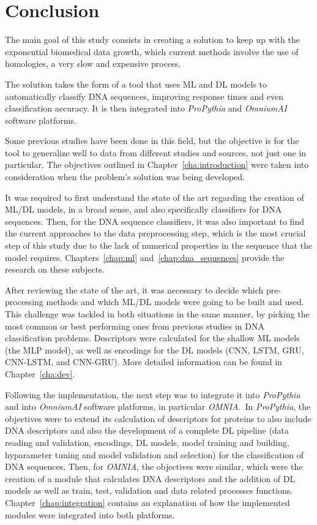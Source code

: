 \chapter{Conclusion}

The main goal of this study consists in creating a solution to keep up with the exponential biomedical data growth, which current methods involve the use of homologies, a very slow and expensive process. 

The solution takes the form of a tool that uses \gls{ML} and \gls{DL} models to automatically classify \gls{DNA} sequences, improving response times and even classification accuracy. It is then integrated into \textit{ProPythia} and \textit{OmniumAI} software platforms.

Some previous studies have been done in this field, but the objective is for the tool to generalize well to data from different studies and sources, not just one in particular. The objectives outlined in Chapter~\ref{cha:introduction} were taken into consideration when the problem's solution was being developed.

It was required to first understand the state of the art regarding the creation of \gls{ML}/\gls{DL} models, in a broad sense, and also specifically classifiers for \gls{DNA} sequences. Then, for the \gls{DNA} sequence classifiers, it was also important to find the current approaches to the data preprocessing step, which is the most crucial step of this study due to the lack of numerical properties in the sequence that the model requires. Chapters~\ref{chap:ml} and~\ref{chap:dna_sequences} provide the research on these subjects.

After reviewing the state of the art, it was necessary to decide which pre-processing methods and which \gls{ML}/\gls{DL} models were going to be built and used. This challenge was tackled in both situations in the same manner, by picking the most common or best performing ones from previous studies in \gls{DNA} classification problems. Descriptors were calculated for the shallow \gls{ML} models (the \gls{MLP} model), as well as encodings for the \gls{DL} models (\gls{CNN}, \gls{LSTM}, \gls{GRU}, CNN-LSTM, and CNN-GRU). More detailed information can be found in Chapter~\ref{cha:dev}.

Following the implementation, the next step was to integrate it into \textit{ProPythia} and into \textit{OmniumAI} software platforms, in particular \textit{OMNIA}. In \textit{ProPythia}, the objectives were to extend its calculation of descriptors for proteins to also include \gls{DNA} descriptors and also the development of a complete \gls{DL} pipeline (data reading and validation, encodings, \gls{DL} models, model training and building, hyparameter tuning and model validation and selection) for the classification of \gls{DNA} sequences. Then, for \textit{OMNIA}, the objectives were similar, which were the creation of a module that calculates \gls{DNA} descriptors and the addition of \gls{DL} models as well as train, test, validation and data related processes functions. Chapter~\ref{chap:integration} contains an explanation of how the implemented modules were integrated into both platforms.

